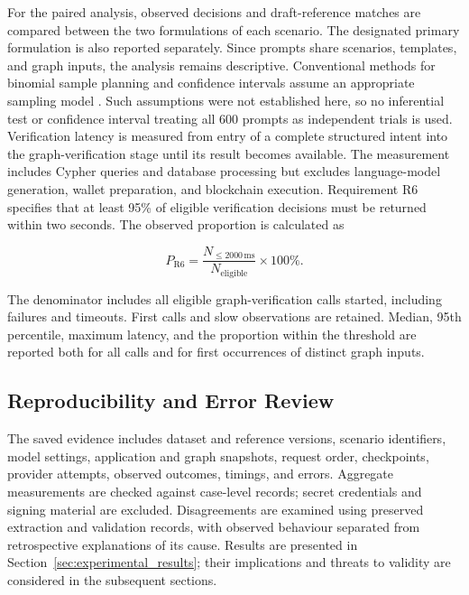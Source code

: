 For the paired analysis, observed decisions and draft-reference matches are
compared between the two formulations of each scenario. The designated primary
formulation is also reported separately. Since prompts share scenarios,
templates, and graph inputs, the analysis remains descriptive. Conventional
methods for binomial sample planning and confidence intervals assume an
appropriate sampling model \cite{evalNISTSampleSize,evalNISTConfidence,evalWilson1927}.
Such assumptions were not established here, so no inferential test or
confidence interval treating all 600 prompts as independent trials is used. Verification latency is measured from entry of a complete structured intent
into the graph-verification stage until its result becomes available. The
measurement includes Cypher queries and database processing but excludes
language-model generation, wallet preparation, and blockchain execution.
Requirement R6 specifies that at least 95\% of eligible verification decisions
must be returned within two seconds. The observed proportion is calculated as

\begin{equation}
    P_{\mathrm{R6}} =
    \frac{N_{\leq 2000\,\mathrm{ms}}}{N_{\mathrm{eligible}}}
    \times 100\%.
    \label{eq:evaluation_r6}
\end{equation}

The denominator includes all eligible graph-verification calls started,
including failures and timeouts. First calls and slow observations are
retained. Median, 95th percentile, maximum latency, and the proportion within
the threshold are reported both for all calls and for first occurrences of
distinct graph inputs.

\subsection{Reproducibility and Error Review}
\label{sec:evaluation_reproducibility}

The saved evidence includes dataset and reference versions, scenario identifiers,
model settings, application and graph snapshots, request order, checkpoints,
provider attempts, observed outcomes, timings, and errors. Aggregate
measurements are checked against case-level records; secret credentials and
signing material are excluded. Disagreements are examined using preserved
extraction and validation records, with observed behaviour separated from
retrospective explanations of its cause. Results are presented in
Section~\ref{sec:experimental_results}; their implications and threats to
validity are considered in the subsequent sections.


